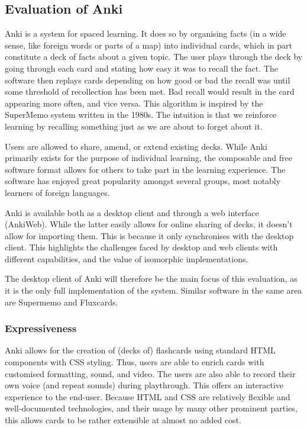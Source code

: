\subsection{Evaluation of Anki}

Anki is a system for spaced learning. It does so by organising facts (in a wide
sense, like foreign words or parts of a map) into individual cards, which in
part constitute a deck of facts about a given topic. The user plays through the
deck by going through each card and stating how easy it was to recall the fact.
The software then replays cards depending on how good or bad the recall was
until some threshold of recollection has been met. Bad recall would result in 
the card appearing more often, and vice versa. This algorithm is inspired by the
SuperMemo system written in the 1980s. The intuition is that we reinforce
learning by recalling something just as we are about to forget about it.

Users are allowed to share, amend, or extend existing decks. While Anki
primarily exists for the purpose of individual learning, the composable and
free software format allows for others to take part in the learning 
experience. The software has enjoyed great popularity amongst several groups, 
most notably learners of foreign languages.

Anki is available both as a desktop client and through a web interface
(AnkiWeb). While the latter easily allows for online sharing of decks,
it doesn't allow for importing them. This is because it only synchronises with
the desktop client. This highlights the challenges faced by desktop and web
clients with different capabilities, and the value of isomorphic
implementations.

The desktop client of Anki will therefore be the main focus of this evaluation,
as it is the only full implementation of the system. Similar software in the
same area are Supermemo and Fluxcards.

\subsubsection{Expressiveness}

Anki allows for the creation of (decks of) flashcards using standard HTML
components with CSS styling. Thus, users are able to enrich cards with
customised formatting, sound, and video. The users are also able to record their
own voice (and repeat sounds) during playthrough. This offers an interactive
experience to the end-user. Because HTML and CSS are relatively flexible and
well-documented technologies, and their usage by many other prominent parties,
this allows cards to be rather extensible at almost no added cost.

